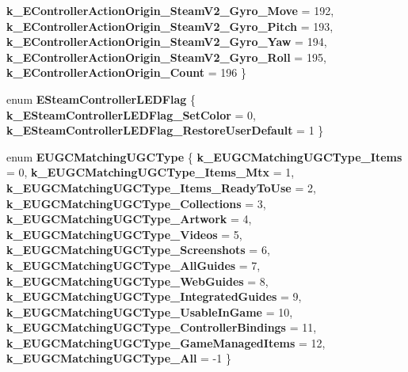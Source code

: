 \begin{DoxyCompactItemize}
{\bfseries k\+\_\+\+E\+Controller\+Action\+Origin\+\_\+\+Steam\+V2\+\_\+\+Gyro\+\_\+\+Move} = 192, 
{\bfseries k\+\_\+\+E\+Controller\+Action\+Origin\+\_\+\+Steam\+V2\+\_\+\+Gyro\+\_\+\+Pitch} = 193, 
{\bfseries k\+\_\+\+E\+Controller\+Action\+Origin\+\_\+\+Steam\+V2\+\_\+\+Gyro\+\_\+\+Yaw} = 194, 
{\bfseries k\+\_\+\+E\+Controller\+Action\+Origin\+\_\+\+Steam\+V2\+\_\+\+Gyro\+\_\+\+Roll} = 195, 
\newline
{\bfseries k\+\_\+\+E\+Controller\+Action\+Origin\+\_\+\+Count} = 196
 \}
\item 
\mbox{\label{namespace_valve_1_1_steamworks_a6067d2c8b352314a940cdbd7e60b0c2d}} 
enum {\bfseries E\+Steam\+Controller\+L\+E\+D\+Flag} \{ {\bfseries k\+\_\+\+E\+Steam\+Controller\+L\+E\+D\+Flag\+\_\+\+Set\+Color} = 0, 
{\bfseries k\+\_\+\+E\+Steam\+Controller\+L\+E\+D\+Flag\+\_\+\+Restore\+User\+Default} = 1
 \}
\item 
\mbox{\label{namespace_valve_1_1_steamworks_a66d832b44ee237501bb601ba562d0f97}} 
enum {\bfseries E\+U\+G\+C\+Matching\+U\+G\+C\+Type} \{ \newline
{\bfseries k\+\_\+\+E\+U\+G\+C\+Matching\+U\+G\+C\+Type\+\_\+\+Items} = 0, 
{\bfseries k\+\_\+\+E\+U\+G\+C\+Matching\+U\+G\+C\+Type\+\_\+\+Items\+\_\+\+Mtx} = 1, 
{\bfseries k\+\_\+\+E\+U\+G\+C\+Matching\+U\+G\+C\+Type\+\_\+\+Items\+\_\+\+Ready\+To\+Use} = 2, 
{\bfseries k\+\_\+\+E\+U\+G\+C\+Matching\+U\+G\+C\+Type\+\_\+\+Collections} = 3, 
\newline
{\bfseries k\+\_\+\+E\+U\+G\+C\+Matching\+U\+G\+C\+Type\+\_\+\+Artwork} = 4, 
{\bfseries k\+\_\+\+E\+U\+G\+C\+Matching\+U\+G\+C\+Type\+\_\+\+Videos} = 5, 
{\bfseries k\+\_\+\+E\+U\+G\+C\+Matching\+U\+G\+C\+Type\+\_\+\+Screenshots} = 6, 
{\bfseries k\+\_\+\+E\+U\+G\+C\+Matching\+U\+G\+C\+Type\+\_\+\+All\+Guides} = 7, 
\newline
{\bfseries k\+\_\+\+E\+U\+G\+C\+Matching\+U\+G\+C\+Type\+\_\+\+Web\+Guides} = 8, 
{\bfseries k\+\_\+\+E\+U\+G\+C\+Matching\+U\+G\+C\+Type\+\_\+\+Integrated\+Guides} = 9, 
{\bfseries k\+\_\+\+E\+U\+G\+C\+Matching\+U\+G\+C\+Type\+\_\+\+Usable\+In\+Game} = 10, 
{\bfseries k\+\_\+\+E\+U\+G\+C\+Matching\+U\+G\+C\+Type\+\_\+\+Controller\+Bindings} = 11, 
\newline
{\bfseries k\+\_\+\+E\+U\+G\+C\+Matching\+U\+G\+C\+Type\+\_\+\+Game\+Managed\+Items} = 12, 
{\bfseries k\+\_\+\+E\+U\+G\+C\+Matching\+U\+G\+C\+Type\+\_\+\+All} = -\/1
 \}

\end{DoxyCompactItemize}
